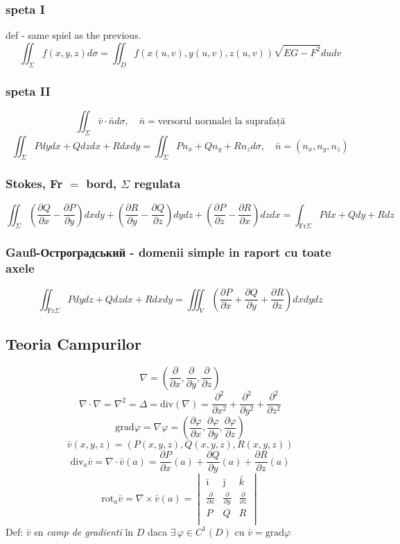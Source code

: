 \documentclass{article}
\newcommand{\parti}[2]{\frac{\partial #1}{ \partial #2}}
\newcommand{\partii}[2]{\frac{\partial^2 #1}{ \partial #2^2}}
\newcommand*{\grad}{\mathrm{grad}}
\renewcommand*{\div}{\mathrm{div}}
\newcommand*{\rot}{\mathrm{rot}}
\begin{document}
\subsubsection*{speta I}
def - same spiel as the previous.
\[\iint_{\Sigma} f(x, y,z) d\sigma = \iint_{D} f(x(u, v), y(u,v), z(u,v)) \sqrt{EG-F^2}du dv\]
\subsubsection*{speta II}
\[ \iint_{\Sigma}\bar{v}\cdot\bar{n} d\sigma, \quad \bar{n} = \text{versorul normalei la suprafață} \]
\[ \iint_{\Sigma} Pdy dx + Q dz dx + R dx dy = \iint_{\Sigma} Pn_x+Qn_y+Rn_z d\sigma, \quad \bar{n} = (n_x, n_y, n_z) \]
\subsubsection*{Stokes, Fr $= $ bord, $\Sigma$ regulata}
\[ \iint_\Sigma \left( \parti Q x - \parti P y \right) dx dy
 + \left( \parti R y - \parti Q z \right)  dy dz
 +\left( \parti P z - \parti R x \right) dz dx = \int_{\mathrm{Fr}\Sigma} Pdx+Qdy+Rdz \]
\subsubsection*{Gauß-Остроградський - domenii simple in raport cu toate axele}
\[ \iint_{\mathrm{Fr}\Sigma}Pdydz+Qdzdx+Rdxdy = \iiint_V \left( \parti P x + \parti Q y + \parti R z \right) dx dy dz \]
\subsection*{Teoria Campurilor}
\[ \nabla = (\parti{}{x}, \parti{}{y}, \parti{}{z}) \]
\[ \nabla \cdot \nabla = \nabla^2 = \Delta = \div(\nabla) = \partii{}{x}+\partii{}{y} +\partii{}{z} \]
\[ \grad \varphi = \nabla \varphi = (\parti{\varphi}{x}, \parti{\varphi}{y}, \parti{\varphi}{z}) \]
\[ \bar{v} (x, y, z) = (P(x, y, z), Q(x,y,z ), R(x, y,z)) \]
\[ \div_a\bar{v} = \nabla \cdot \bar{v}(a) = \parti{P}{x}(a)+\parti{Q}{y}(a) + \parti{R}{z}(a)\]
\[ \rot_a\bar{v} = \nabla \times \bar{v}(a) = \begin{vmatrix}
    \bar{\imath} & \bar{\jmath} & \bar{k}\\
    \parti{}{x}& \parti{}{y} & \parti{}{z} \\
    P & Q & R\\
  \end{vmatrix} \]
Def: $\bar{v}$ sn \emph{camp de gradienti} în $D$ daca $\exists\, \varphi \in C^1(D) $ cu $\bar{v} = \grad \varphi $
\end{document}

